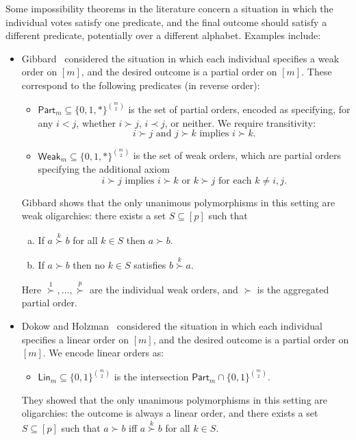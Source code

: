 \documentclass{article}
\providecommand{\Lin}{\mathsf{Lin}}
\providecommand{\Part}{\mathsf{Part}}
\providecommand{\Weak}{\mathsf{Weak}}
\theoremstyle{definition}
\theoremstyle{remark}
\begin{document}
Some impossibility theorems in the literature concern a situation in which the individual votes satisfy one predicate, and the final outcome should satisfy a different predicate, potentially over a different alphabet. Examples include:
\begin{itemize}
\item Gibbard~\cite{GibbardTR} considered the situation in which each individual specifies a weak order on $[m]$, and the desired outcome is a partial order on $[m]$. These correspond to the following predicates (in reverse order):
\begin{itemize}
\item $\Part_m \subseteq \{0,1,*\}^{\binom{m}{2}}$ is the set of partial orders, encoded as specifying, for any $i<j$, whether $i \succ j$, $i \prec j$, or neither. We require transitivity:
\[
 i \succ j \text{ and } j \succ k \text{ implies } i \succ k.
\]
\item $\Weak_m \subseteq \{0,1,*\}^{\binom{m}{2}}$ is the set of weak orders, which are partial orders specifying the additional axiom
\[
 i \succ j \text{ implies } i \succ k \text{ or } k \succ j \text{ for each } k \neq i,j.
\]
\end{itemize}
Gibbard shows that the only unanimous polymorphisms in this setting are weak oligarchies: there exists a set $S \subseteq [p]$ such that
\begin{enumerate}[(a)]
\item If $a \stackrel k\succ b$ for all $k \in S$ then $a \succ b$.
\item If $a \succ b$ then no $k \in S$ satisfies $b \stackrel k\succ a$.
\end{enumerate}
Here $\stackrel1\succ,\dots,\stackrel p\succ$ are the individual weak orders, and $\succ$ is the aggregated partial order.
\item Dokow and Holzman~\cite{DokowHolzman10abs} considered the situation in which each individual specifies a linear order on $[m]$, and the desired outcome is a partial order on $[m]$. We encode linear orders as:
\begin{itemize}
\item $\Lin_m \subseteq \{0,1\}^{\binom{m}{2}}$ is the intersection $\Part_m \cap \{0,1\}^{\binom{m}{2}}$.
\end{itemize}
They showed that the only unanimous polymorphisms in this setting are oligarchies: the outcome is always a linear order, and there exists a set $S \subseteq [p]$ such that $a \succ b$ iff $a \stackrel k \succ b$ for all $k \in S$.
\end{itemize}
\end{document}
